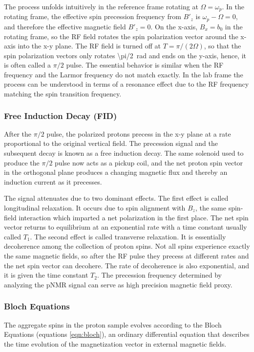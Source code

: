The process unfolds intuitively in the reference frame rotating at $\Omega = \omega_p$.  In the rotating frame, the effective spin precession frequency from $B'_z$ is $\omega_p - \Omega = 0$, and therefore the effective magnetic field $B'_z = 0$.  On the x-axis, $B_x = b_0$ in the rotating frame, so the RF field rotates the spin polarization vector around the x-axis into the x-y plane.  The RF field is turned off at $T = \pi / (2 \Omega)$, so that the spin polarization vectors only rotates \SI{\pi/2}{\radian} and ends on the y-axis, hence, it is often called a $\pi/2$ pulse.  The essential behavior is similar when the RF frequency and the Larmor frequency do not match exactly.  In the lab frame the process can be understood in terms of a resonance effect due to the RF frequency matching the spin transition frequency.  

\subsubsection{Free Induction Decay (FID)}
After the $\pi/2$ pulse, the polarized protons precess in the x-y plane at a rate proportional to the original vertical field.  The precession signal and the subsequent decay is known as a free induction decay.  The same solenoid used to produce the $\pi/2$ pulse now acts as a pickup coil, and the net proton spin vector in the orthogonal plane produces a changing magnetic flux and thereby an induction current as it precesses.  

The signal attenuates due to two dominant effects.  The first effect is called longitudinal relaxation.  It occurs due to spin alignment with $B_z$, the same spin-field interaction which imparted a net polarization in the first place.  The net spin vector returns to equilibrium at an exponential rate with a time constant usually called $T_1$.  The second effect is called transverse relaxation.  It is essentially decoherence among the collection of proton spins.  Not all spins experience exactly the same magnetic fields, so after the RF pulse they precess at different rates and the net spin vector can decohere.  The rate of decoherence is also exponential, and it is given the time constant $T_2$.  The precession frequency determined by analyzing the pNMR signal can serve as high precision magnetic field proxy. 

\subsubsection{Bloch Equations}
The aggregate spins in the proton sample evolves according to the Bloch Equations (equations \ref{eqn:bloch}), an ordinary differential equation that describes the time evolution of the magnetization vector in external magnetic fields.

